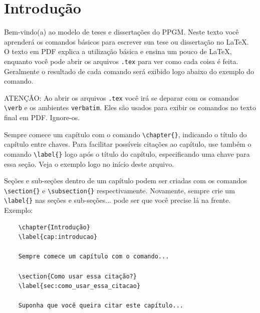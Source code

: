 \chapter{Introdução}
\label{cap:introducao}

Bem-vindo(a) ao modelo de teses e dissertações do PPGM. Neste texto você aprenderá os comandos básicos para escrever sua tese ou dissertação no \LaTeX. O texto em PDF explica a utilização básica e ensina um pouco de \LaTeX, enquanto você pode abrir os arquivos \verb=.tex= para ver como cada coisa é feita. Geralmente o resultado de cada comando será exibido logo abaixo do exemplo do comando.

ATENÇÃO: Ao abrir os arquivos \verb=.tex= você irá se deparar com os comandos \verb=\verb= e os ambientes \verb=verbatim=. Eles são usados para exibir os comandos no texto final em PDF. Ignore-os.

Sempre comece um capítulo com o comando \verb=\chapter{}=, indicando o título do capítulo entre chaves. Para facilitar possíveis citações ao capítulo, use também o comando \verb=\label{}= logo após o título do capítulo, especificando uma chave para essa seção. Veja o exemplo logo no início deste arquivo.

Seções e sub-seções dentro de um capítulo podem ser criadas com os comandos \verb=\section{}= e \verb=\subsection{}= respectivamente. Novamente, sempre crie um \verb=\label{}= nas seções e sub-seções... pode ser que você precise lá na frente. Exemplo:

\begin{verbatim}
    \chapter{Introdução}
    \label{cap:introducao}
    
    Sempre comece um capítulo com o comando...
    
    \section{Como usar essa citação?}
    \label{sec:como_usar_essa_citacao}
    
    Suponha que você queira citar este capítulo...
\end{verbatim}

